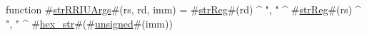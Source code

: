 function #\hyperref[sailMIPSzstrRRIUArgs]{strRRIUArgs}#(rs, rd, imm) = #\hyperref[sailMIPSzstrReg]{strReg}#(rd) ^ ", " ^ #\hyperref[sailMIPSzstrReg]{strReg}#(rs) ^ ", " ^ #\hyperref[sailMIPSzhexzystr]{hex\_str}#(#\hyperref[sailMIPSzunsigned]{unsigned}#(imm))
